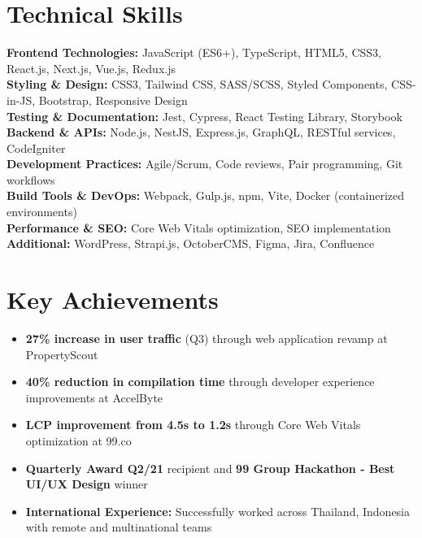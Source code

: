 \documentclass[a4paper, 11pt]{article}
\begin{document}
\section{Technical Skills}
 \begin{itemize}[leftmargin=0.15in, label={}]
    \small{\item{
     \textbf{Frontend Technologies:} JavaScript (ES6+), TypeScript, HTML5, CSS3, React.js, Next.js, Vue.js, Redux.js \\
     \textbf{Styling \& Design:} CSS3, Tailwind CSS, SASS/SCSS, Styled Components, CSS-in-JS, Bootstrap, Responsive Design \\
     \textbf{Testing \& Documentation:} Jest, Cypress, React Testing Library, Storybook \\
     \textbf{Backend \& APIs:} Node.js, NestJS, Express.js, GraphQL, RESTful services, CodeIgniter \\
     \textbf{Development Practices:} Agile/Scrum, Code reviews, Pair programming, Git workflows \\
     \textbf{Build Tools \& DevOps:} Webpack, Gulp.js, npm, Vite, Docker (containerized environments) \\
     \textbf{Performance \& SEO:} Core Web Vitals optimization, SEO implementation \\
     \textbf{Additional:} WordPress, Strapi.js, OctoberCMS, Figma, Jira, Confluence
    }}
 \end{itemize}

\section{Key Achievements}
\vspace{2pt}
\small{
\begin{itemize}[leftmargin=0.15in, label=$\bullet$]
    \item \textbf{27\% increase in user traffic} (Q3) through web application revamp at PropertyScout
    \item \textbf{40\% reduction in compilation time} through developer experience improvements at AccelByte
    \item \textbf{LCP improvement from 4.5s to 1.2s} through Core Web Vitals optimization at 99.co
    \item \textbf{Quarterly Award Q2/21} recipient and \textbf{99 Group Hackathon - Best UI/UX Design} winner
    \item \textbf{International Experience:} Successfully worked across Thailand, Indonesia with remote and multinational teams
\end{itemize}
}
\vspace{5pt}
\end{document}
